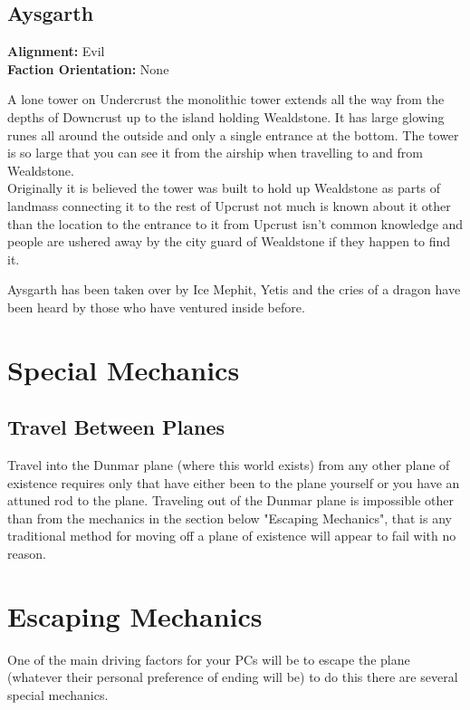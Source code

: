 \documentclass[10pt,twoside,twocolumn]{article}
\begin{document}
\subsection{Aysgarth}
\textbf{Alignment:} Evil \\
\textbf{Faction Orientation:} None \\
\begin{quotebox}
	A lone tower on Undercrust the monolithic tower extends all the way from the depths of Downcrust up to the island holding Wealdstone. It has large glowing runes all around the outside and only a single entrance at the bottom. The tower is so large that you can see it from the airship when travelling to and from Wealdstone. \\

	Originally it is believed the tower was built to hold up Wealdstone as parts of landmass connecting it to the rest of Upcrust not much is known about it other than the location to the entrance to it from Upcrust isn't common knowledge and people are ushered away by the city guard of Wealdstone if they happen to find it.\\
\end{quotebox}

Aysgarth has been taken over by Ice Mephit, Yetis and the cries of a dragon have been heard by those who have ventured inside before.

\section{Special Mechanics}

\subsection{Travel Between Planes}
Travel into the Dunmar plane (where this world exists) from any other plane of existence requires only that have either been to the plane yourself or you have an attuned rod to the plane. Traveling out of the Dunmar plane is impossible other than from the mechanics in the section below "Escaping Mechanics", that is any traditional method for moving off a plane of existence will appear to fail with no reason.\\

\section{Escaping Mechanics}
One of the main driving factors for your PCs will be to escape the plane (whatever their personal preference of ending will be) to do this there are several special mechanics.\\
\end{document}
